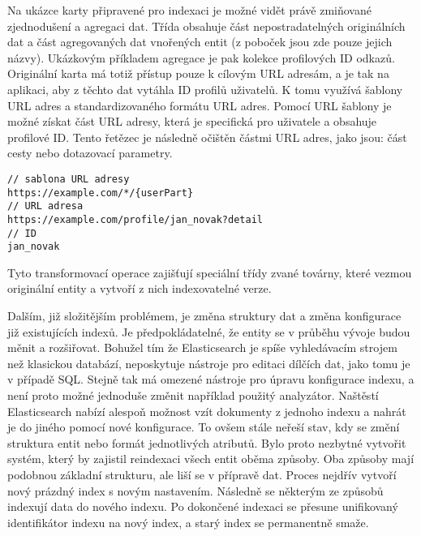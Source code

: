 		Na ukázce karty připravené pro indexaci je možné vidět právě zmiňované zjednodušení a agregaci dat.
		Třída obsahuje část nepostradatelných originálních dat a část agregovaných dat vnořených entit (z poboček jsou
		zde pouze jejich názvy).
		Ukázkovým příkladem agregace je pak kolekce profilových ID odkazů.
		Originální karta má totiž přístup pouze k cílovým \ac{URL} adresám, a je tak na aplikaci, aby z těchto dat
		vytáhla ID profilů uživatelů.
		K tomu využívá šablony \ac{URL} adres a standardizovaného formátu \ac{URL} adres.
		Pomocí \ac{URL} šablony je možné získat část \ac{URL} adresy, která je specifická pro uživatele a obsahuje profilové ID.
		Tento řetězec je následně očištěn částmi \ac{URL} adres, jako jsou: část cesty nebo dotazovací parametry.

		\begin{codeblock}
			\begin{verbatim}
// sablona URL adresy
https://example.com/*/{userPart}
// URL adresa
https://example.com/profile/jan_novak?detail
// ID
jan_novak
			\end{verbatim}
		\end{codeblock}

		Tyto transformovací operace zajišťují speciální třídy zvané továrny, které vezmou originální entity a vytvoří
		z nich indexovatelné verze.

		Dalším, již složitějším problémem, je změna struktury dat a změna konfigurace již existujících indexů.
		Je předpokládatelné, že entity se v průběhu vývoje budou měnit a rozšiřovat.
		Bohužel tím že Elasticsearch je spíše vyhledávacím strojem než klasickou databází, neposkytuje nástroje pro editaci
		dílčích dat, jako tomu je v případě \ac{SQL}.
		Stejně tak má omezené nástroje pro úpravu konfigurace indexu, a není proto možné jednoduše změnit například
		použitý analyzátor.
		Naštěstí Elasticsearch nabízí alespoň možnost vzít dokumenty z jednoho indexu a nahrát je do jiného pomocí nové
		konfigurace.
		To ovšem stále neřeší stav, kdy se změní struktura entit nebo formát jednotlivých atributů.
		Bylo proto nezbytné vytvořit systém, který by zajistil reindexaci všech entit oběma způsoby.
		Oba způsoby mají podobnou základní strukturu, ale liší se v přípravě dat.
		Proces nejdřív vytvoří nový prázdný index s novým nastavením.
		Následně se některým ze způsobů indexují data do nového indexu.
		Po dokončené indexaci se přesune unifikovaný identifikátor indexu na nový index, a starý index se permanentně
		smaže.

